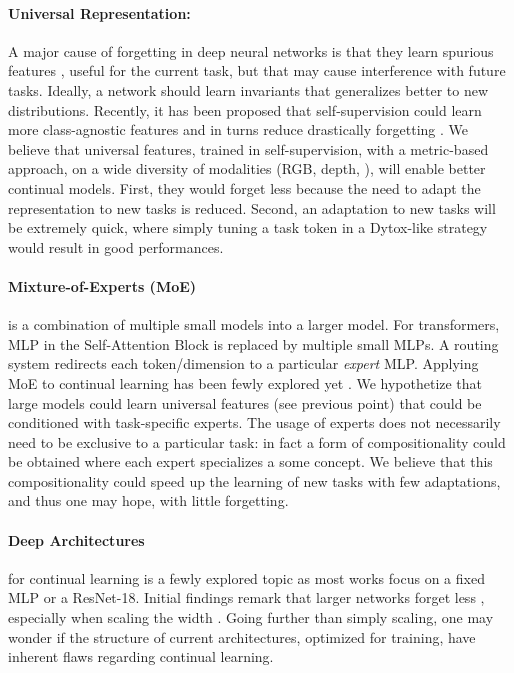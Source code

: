 \paragraph{Universal Representation:} A major cause of forgetting in deep neural networks is that
they learn spurious features \citep{lesort2022spuriousfeatures}, useful for the current task, but
that may cause interference with future tasks. Ideally, a network should learn invariants
\citep{rame2021fishr} that generalizes better to new distributions. Recently, it has been proposed
that self-supervision could learn more class-agnostic features and in turns reduce drastically
forgetting \citep{gallardo2021selfsupcontinual}. We believe that universal features, trained in
self-supervision, with a metric-based approach, on a wide diversity of modalities (RGB, depth,
\etc), will enable better continual models. First, they would forget less because the need to adapt the
representation to new tasks is reduced. Second, an adaptation to new tasks will be extremely quick,
where simply tuning a task token in a Dytox-like strategy would result in good performances.

\paragraph{Mixture-of-Experts (MoE)} is a combination of multiple small models into a larger model. For
transformers, MLP in the Self-Attention Block is replaced by multiple small MLPs. A routing system
redirects each token/dimension to a particular \textit{expert} MLP. Applying MoE to continual
learning has been fewly explored yet \citep{caccia2022anytimelearning}. We hypothetize that large
models could learn universal features (see previous point) that could be conditioned with
task-specific experts. The usage of experts does not necessarily need to be exclusive to a
particular task: in fact a form of compositionality could be obtained where each expert specializes
a some concept. We believe that this compositionality could speed up the learning of new tasks with
few adaptations, and thus one may hope, with little forgetting.

\paragraph{Deep Architectures} for continual learning is a fewly explored topic as most works focus
on a fixed MLP or a ResNet-18. Initial findings remark that larger networks forget less
\citep{ramasesh2022scalecontinual}, especially when scaling the width
\citep{mirzadeh2022widecontinualnetworks}. Going further than simply scaling, one may wonder if the
structure of current architectures, optimized for \iid training, have inherent flaws regarding
continual learning.

